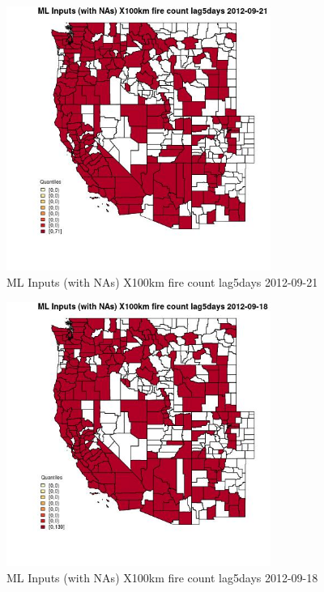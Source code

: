 \begin{figure} 
\centering  
\includegraphics[width=0.77\textwidth]{Code_Outputs/Report_ML_input_PM25_Step4_part_e_de_duplicated_aves_compiled_2019-05-14wNAs_CountyX100km_fire_count_lag5daysMean2012-09-21_2012-09-21.jpg} 
\caption{\label{fig:Report_ML_input_PM25_Step4_part_e_de_duplicated_aves_compiled_2019-05-14wNAsCountyX100km_fire_count_lag5daysMean2012-09-21_2012-09-21}ML Inputs (with NAs) X100km fire count lag5days 2012-09-21} 
\end{figure} 
 

\begin{figure} 
\centering  
\includegraphics[width=0.77\textwidth]{Code_Outputs/Report_ML_input_PM25_Step4_part_e_de_duplicated_aves_compiled_2019-05-14wNAs_CountyX100km_fire_count_lag5daysMean2012-09-18_2012-09-18.jpg} 
\caption{\label{fig:Report_ML_input_PM25_Step4_part_e_de_duplicated_aves_compiled_2019-05-14wNAsCountyX100km_fire_count_lag5daysMean2012-09-18_2012-09-18}ML Inputs (with NAs) X100km fire count lag5days 2012-09-18} 
\end{figure} 
 

